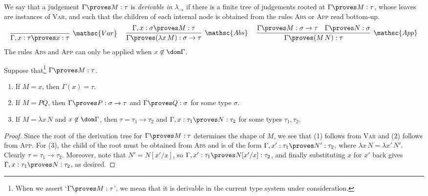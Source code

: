 \documentclass[reqno]{amsart}
\begin{document}
    \begin{definition}
        We say that a judgement $\Gamma\proves M:\tau$ is \textit{derivable in $\lambda_\rightarrow$} if there is a finite tree of judgements rooted at $\Gamma\proves M:\tau$, whose leaves are instances of \textsc{Var}, and such that the children of each internal node is obtained from the rules \textsc{Abs} or \textsc{App} read bottom-up.
        \begin{equation*}
            \infer[\mathsc{Var}]{\Gamma,x:\tau\proves x:\tau}{}\ \ \ \ 
            \infer[\mathsc{Abs}]{\Gamma\proves(\lambda x\,M):\sigma\rightarrow\tau}{\Gamma,x:\sigma\proves M:\tau}\ \ \ \ 
            \infer[\mathsc{App}]{\Gamma\proves(M\,N):\tau}{
                \Gamma\proves M:\sigma\rightarrow\tau &
                \Gamma\proves N:\sigma
            }
        \end{equation*}
        The rules \textsc{Abs} and \textsc{App} can only be applied when $x\not\in\dom\Gamma$.
    \end{definition}

    \begin{lemma}\label{lem:simply_typed_generation}
        Suppose that\footnote{When we assert `$\Gamma\proves M:\tau$', we mean that it is derivable in the current type system under consideration.} $\Gamma\proves M:\tau$.
        \begin{enumerate}
            \item If $M=x$, then $\Gamma(x)=\tau$.
            \item If $M=PQ$, then $\Gamma\proves P:\sigma\rightarrow\tau$ and $\Gamma\proves Q:\sigma$ for some type $\sigma$.
            \item If $M=\lambda x\,N$ and $x\not\in\dom\Gamma$, then $\tau=\tau_1\rightarrow\tau_2$ and $\Gamma,x:\tau_1\proves N:\tau_2$ for some types $\tau_1,\tau_2$.
        \end{enumerate}
    \end{lemma}
    \begin{proof}
        Since the root of the derivation tree for $\Gamma\proves M:\tau$ determines the shape of $M$, we see that (1) follows from \textsc{Var} and (2) follows from \textsc{App}. For (3), the child of the root must be obtained from \textsc{Abs} and is of the form $\Gamma,x':\tau_1\proves N':\tau_2$, where $\lambda x\,N=\lambda x'\,N'$. Clearly $\tau=\tau_1\rightarrow\tau_2$. Moreover, note that $N'=N[x'/x]$, so $\Gamma,x':\tau_1\proves N[x'/x]:\tau_2$, and finally substituting $x$ for $x'$ back gives $\Gamma,x:\tau_1\proves N:\tau_2$, as desired.
    \end{proof}
\end{document}
